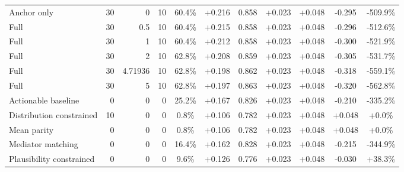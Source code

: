 \begin{table}[htbp]
\begin{tabular}{lrrrccccccc}
Anchor only & 30 & 0 & 10 & 60.4\% & +0.216 & 0.858 & +0.023 & +0.048 & -0.295 & -509.9\% \\
Full & 30 & 0.5 & 10 & 60.4\% & +0.215 & 0.858 & +0.023 & +0.048 & -0.296 & -512.6\% \\
Full & 30 & 1 & 10 & 60.4\% & +0.212 & 0.858 & +0.023 & +0.048 & -0.300 & -521.9\% \\
Full & 30 & 2 & 10 & 62.8\% & +0.208 & 0.859 & +0.023 & +0.048 & -0.305 & -531.7\% \\
Full & 30 & 4.71936 & 10 & 62.8\% & +0.198 & 0.862 & +0.023 & +0.048 & -0.318 & -559.1\% \\
Full & 30 & 5 & 10 & 62.8\% & +0.197 & 0.863 & +0.023 & +0.048 & -0.320 & -562.8\% \\
Actionable baseline & 0 & 0 & 0 & 25.2\% & +0.167 & 0.826 & +0.023 & +0.048 & -0.210 & -335.2\% \\
Distribution constrained & 10 & 0 & 0 & 0.8\% & +0.106 & 0.782 & +0.023 & +0.048 & +0.048 & +0.0\% \\
Mean parity & 0 & 0 & 0 & 0.8\% & +0.106 & 0.782 & +0.023 & +0.048 & +0.048 & +0.0\% \\
Mediator matching & 0 & 0 & 0 & 16.4\% & +0.162 & 0.828 & +0.023 & +0.048 & -0.215 & -344.9\% \\
Plausibility constrained & 0 & 0 & 0 & 9.6\% & +0.126 & 0.776 & +0.023 & +0.048 & -0.030 & +38.3\% \\
\bottomrule
\end{tabular}
\end{table}